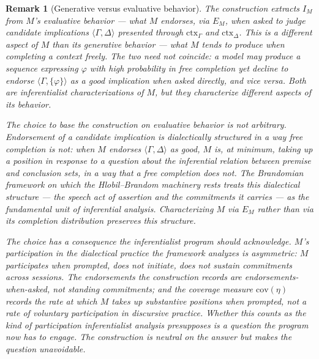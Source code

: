 \documentclass[11pt]{article}
\newtheorem{remark}{Remark}
\begin{document}
\begin{remark}[Generative versus evaluative behavior]
The construction extracts $I_M$ from $M$'s evaluative behavior --- what $M$ endorses, via $E_M$, when asked to judge candidate implications $\langle \Gamma, \Delta \rangle$ presented through $\mathrm{ctx}_\Gamma$ and $\mathrm{ctx}_\Delta$. This is a different aspect of $M$ than its generative behavior --- what $M$ tends to produce when completing a context freely. The two need not coincide: a model may produce a sequence expressing $\varphi$ with high probability in free completion yet decline to endorse $\langle \Gamma, \{\varphi\} \rangle$ as a good implication when asked directly, and vice versa. Both are inferentialist characterizations of $M$, but they characterize different aspects of its behavior.

The choice to base the construction on evaluative behavior is not arbitrary. Endorsement of a candidate implication is dialectically structured in a way free completion is not: when $M$ endorses $\langle \Gamma, \Delta \rangle$ as good, $M$ is, at minimum, taking up a position in response to a question about the inferential relation between premise and conclusion sets, in a way that a free completion does not. The Brandomian framework on which the Hlobil--Brandom machinery rests treats this dialectical structure --- the speech act of assertion and the commitments it carries --- as the fundamental unit of inferential analysis. Characterizing $M$ via $E_M$ rather than via its completion distribution preserves this structure.

The choice has a consequence the inferentialist program should acknowledge. $M$'s participation in the dialectical practice the framework analyzes is asymmetric: $M$ participates when prompted, does not initiate, does not sustain commitments across sessions. The endorsements the construction records are endorsements-when-asked, not standing commitments; and the coverage measure $\mathrm{cov}(\eta)$ records the rate at which $M$ takes up substantive positions when prompted, not a rate of voluntary participation in discursive practice. Whether this counts as the kind of participation inferentialist analysis presupposes is a question the program now has to engage. The construction is neutral on the answer but makes the question unavoidable. 
\end{remark}
\end{document}

